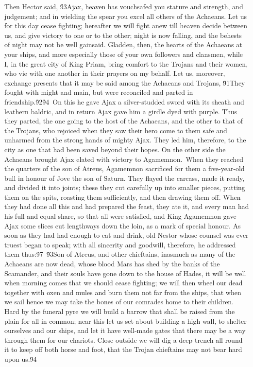 {Then Hector said, \'93Ajax, heaven has vouchsafed you stature and strength, and judgement; and in wielding the spear you excel all others of the Achaeans. Let us for this day cease fighting; hereafter we will fight anew till heaven decide between us, and give victory to one or to the other; night is now falling, and the behests of night may not be well gainsaid. Gladden, then, the hearts of the Achaeans at your ships, and more especially those of your own followers and clansmen, while I, in the great city of King Priam, bring comfort to the Trojans and their women, who vie with one another in their prayers on my behalf. Let us, moreover, exchange presents that it may be said among the Achaeans and Trojans, \'91They fought with might and main, but were reconciled and parted in friendship.\'92\'94\
On this he gave Ajax a silver-studded sword with its sheath and leathern baldric, and in return Ajax gave him a girdle dyed with purple. Thus they parted, the one going to the host of the Achaeans, and the other to that of the Trojans, who rejoiced when they saw their hero come to them safe and unharmed from the strong hands of mighty Ajax. They led him, therefore, to the city as one that had been saved beyond their hopes. On the other side the Achaeans brought Ajax elated with victory to Agamemnon.\
When they reached the quarters of the son of Atreus, Agamemnon sacrificed for them a five-year-old bull in honour of Jove the son of Saturn. They flayed the carcass, made it ready, and divided it into joints; these they cut carefully up into smaller pieces, putting them on the spits, roasting them sufficiently, and then drawing them off. When they had done all this and had prepared the feast, they ate it, and every man had his full and equal share, so that all were satisfied, and King Agamemnon gave Ajax some slices cut lengthways down the loin, as a mark of special honour. As soon as they had had enough to eat and drink, old Nestor whose counsel was ever truest began to speak; with all sincerity and goodwill, therefore, he addressed them thus:\'97\
\'93Son of Atreus, and other chieftains, inasmuch as many of the Achaeans are now dead, whose blood Mars has shed by the banks of the Scamander, and their souls have gone down to the house of Hades, it will be well when morning comes that we should cease fighting; we will then wheel our dead together with oxen and mules and burn them not far from the ships, that when we sail hence we may take the bones of our comrades home to their children. Hard by the funeral pyre we will build a barrow that shall be raised from the plain for all in common; near this let us set about building a high wall, to shelter ourselves and our ships, and let it have well-made gates that there may be a way through them for our chariots. Close outside we will dig a deep trench all round it to keep off both horse and foot, that the Trojan chieftains may not bear hard upon us.\'94\
}
